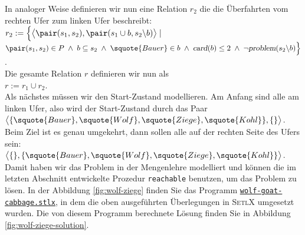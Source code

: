 In analoger Weise definieren wir nun eine Relation $r_2$ die die Überfahrten vom rechten
Ufer zum linken Ufer beschreibt:\\[0.2cm]
\hspace*{1.3cm} 
$r_2 := \Bigl\{ \bigl\langle \pair(s_1, s_2), \pair(s_1 \cup b, s_2 \backslash b)
  \bigr\rangle \;|\; $ \\
\hspace*{2.3cm} 
$\pair(s_1, s_2) \in P \;\wedge\; b \subseteq s_2 \;\wedge\;
 \squote{Bauer} \in b \;\wedge\; \textsl{card}(b) \leq 2 \;\wedge\; \neg\textsl{problem}(s_2 \backslash b) \Bigr\}$.
\\[0.2cm]
Die gesamte Relation $r$ definieren wir nun als
\\[0.2cm]
\hspace*{1.3cm} $r := r_1 \cup r_2$.\\[0.2cm]
Als nächstes müssen wir den Start-Zustand modellieren.
Am Anfang sind alle am linken Ufer, also wird der Start-Zustand durch das Paar 
\\[0.3cm]
\hspace*{1.3cm}
$\bigl\langle \{ \squote{Bauer}, \squote{Wolf}, \squote{Ziege},\squote{Kohl} \}, \{\} \bigr\rangle$.
\\[0.3cm]
Beim Ziel ist es genau umgekehrt, dann sollen alle auf der rechten Seite des Ufers sein:
\\[0.3cm]
\hspace*{1.3cm}
$\bigl\langle \{\}, \{ \squote{Bauer}, \squote{Wolf}, \squote{Ziege},\squote{Kohl} \} \bigr\rangle$.
\\[0.3cm]
Damit haben wir das Problem in der Mengenlehre modelliert und können die im letzten
Abschnitt entwickelte Prozedur \texttt{reachable} benutzen, um das Problem zu lösen.
In der Abbildung \ref{fig:wolf-ziege} finden Sie das Programm 
\href{https://github.com/karlstroetmann/Logik/blob/master/SetlX/wolf-goat-cabbage.stlx}{\texttt{wolf-goat-cabbage.stlx}},
in dem die oben ausgeführten Überlegungen in \textsc{SetlX} umgesetzt wurden.
Die von diesem Programm berechnete Lösung finden Sie in Abbildung \ref{fig:wolf-ziege-solution}.

